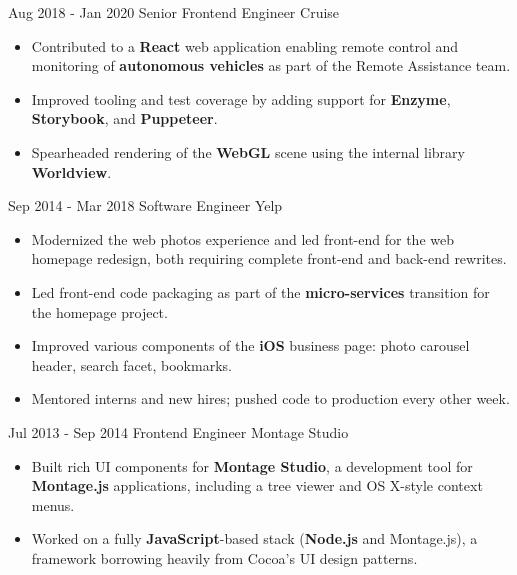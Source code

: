 \documentclass[]{friggeri-cv}
\begin{document}
\begin{entrylist}
    \entry
    {Aug 2018 - Jan 2020}
    {Senior Frontend Engineer}
    {Cruise}
    {\begin{itemize}[nosep, leftmargin=1em, topsep=2pt]
        \item Contributed to a \textbf{React} web application enabling remote control and monitoring of \textbf{autonomous vehicles} as part of the Remote Assistance team.
        \item Improved tooling and test coverage by adding support for \textbf{Enzyme}, \textbf{Storybook}, and \textbf{Puppeteer}.
        \item Spearheaded rendering of the \textbf{WebGL} scene using the internal library \textbf{Worldview}.
    \end{itemize}}

    \entry
    {Sep 2014 - Mar 2018}
    {Software Engineer}
    {Yelp}
    {\begin{itemize}[nosep, leftmargin=1em, topsep=2pt]
        \item Modernized the web photos experience and led front-end for the web homepage redesign, both requiring complete front-end and back-end rewrites.
        \item Led front-end code packaging as part of the \textbf{micro-services} transition for the homepage project.
        \item Improved various components of the \textbf{iOS} business page: photo carousel header, search facet, bookmarks.
        \item Mentored interns and new hires; pushed code to production every other week.
    \end{itemize}}

    \entry
    {Jul 2013 - Sep 2014}
    {Frontend Engineer}
    {Montage Studio}
    {\begin{itemize}[nosep, leftmargin=1em, topsep=2pt]
        \item Built rich UI components for \textbf{Montage Studio}, a development tool for \textbf{Montage.js} applications, including a tree viewer and OS X-style context menus.
        \item Worked on a fully \textbf{JavaScript}-based stack (\textbf{Node.js} and Montage.js), a framework borrowing heavily from Cocoa's UI design patterns.
    \end{itemize}}
\end{entrylist}
\end{document}
